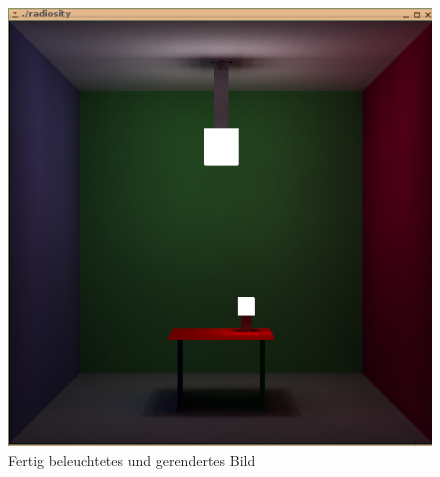 \documentclass[final,a4paper,11pt,notitlepage,halfparskip]{scrreprt}
\begin{document}
\begin{appendix}
\begin{figure}[htb]
    \includegraphics[width=12cm]{img/all.png}
    \caption{Fertig beleuchtetes und gerendertes Bild}
    \label{fig:all}
  \end{figure}
\end{appendix}
\end{document}

